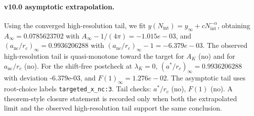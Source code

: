 \paragraph{v10.0 asymptotic extrapolation.}
Using the converged high-resolution tail, we fit $y(N_{\mathrm{int}})=y_{\infty}+cN_{\mathrm{int}}^{-\alpha}$, obtaining $A_\infty=0.0785623702$ with $A_\infty-1/(4\pi)=-1.015e-03$, and $(a_{\mathrm{nc}}/r_c)_\infty=0.9936206288$ with $(a_{\mathrm{nc}}/r_c)_\infty-1=-6.379e-03$. The observed high-resolution tail is quasi-monotone toward the target for $A_K$ (no) and for $a_{\mathrm{nc}}/r_c$ (no). For the shift-free postcheck at $\lambda_K=0$, $(a^*/r_c)_\infty=0.9936206288$ with deviation -6.379e-03, and $F(1)_\infty=1.276e-02$. The asymptotic tail uses root-choice labels \texttt{targeted_x_nc:3}. Tail checks: $a^*/r_c$ (no), $F(1)$ (no). A theorem-style closure statement is recorded only when both the extrapolated limit and the
observed high-resolution tail support the same conclusion.
